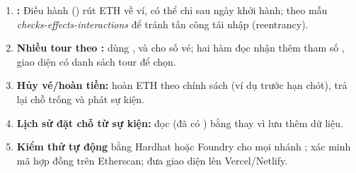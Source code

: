 \begin{enumerate}[leftmargin=1.8em]
    \item \textbf{:} Điều hành () rút ETH về ví, có thể chỉ sau ngày khởi hành; theo mẫu
          \emph{checks-effects-interactions} để tránh tấn công tái nhập (reentrancy).
    \item \textbf{Nhiều tour theo :} dùng ,
           và  cho số vé; hai hàm đọc nhận thêm tham số ,
          giao diện có danh sách tour để chọn.
    \item \textbf{Hủy vé/hoàn tiền:}  hoàn ETH theo chính sách (ví dụ trước hạn chót), trả lại chỗ trống và phát sự kiện.
    \item \textbf{Lịch sử đặt chỗ từ sự kiện:} đọc  (đã có  ) bằng  thay vì lưu thêm dữ liệu.
    \item \textbf{Kiểm thử tự động} bằng Hardhat hoặc Foundry cho mọi nhánh ; xác minh mã hợp đồng trên Etherscan; đưa giao diện lên Vercel/Netlify.
\end{enumerate}
